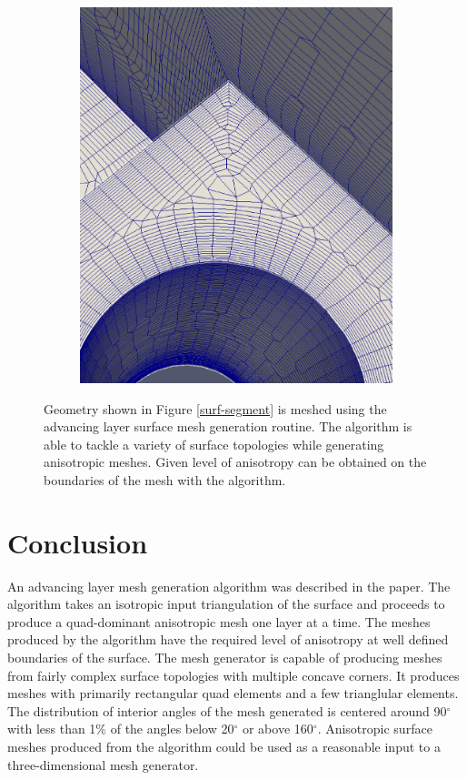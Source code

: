 \documentclass[conf]{new-aiaa}
\begin{document}
\begin{figure}[hbt!]
\begin{subfigure}{0.33\textwidth}
	\includegraphics[width=0.9\linewidth]{meshCases/joint-x0.004-g1.04-a5/closeUp.eps}
	\caption{}
	\label{fig-joint-closeUp}
\end{subfigure}
\caption{Geometry shown in Figure \ref{surf-segment} is meshed using the advancing layer surface mesh generation routine. The algorithm is able to tackle a variety of surface topologies while generating anisotropic meshes. Given level of anisotropy can be obtained on the boundaries of the mesh with the algorithm.}
\label{fig-joint}
\end{figure}

\section{Conclusion}

An advancing layer mesh generation algorithm was described in the paper. The algorithm takes an isotropic input triangulation of the surface and proceeds to produce a quad-dominant anisotropic mesh one layer at a time. The meshes produced by the algorithm have the required level of anisotropy at well defined boundaries of the surface. The mesh generator is capable of producing meshes from fairly complex surface topologies with multiple concave corners. It produces meshes with primarily rectangular quad elements and a few trianglular elements. The distribution of interior angles of the mesh generated is centered around 90$^\circ$ with less than 1\% of the angles below 20$^\circ$ or above 160$^\circ$. Anisotropic surface meshes produced from the algorithm could be used as a reasonable input to a three-dimensional mesh generator.%
\end{document}
